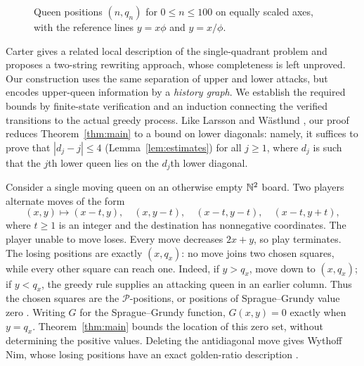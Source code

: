 \begin{figure}[!ht]
\begin{minipage}[c]{0.60\linewidth}
\end{minipage}
\caption{Queen positions $(n,q_n)$ for $0\le n\le100$ on equally scaled
axes, with the reference lines $y=x\phi$ and $y=x/\phi$.}
\label{fig:golden-lines}
\end{figure}

Carter \cite[Section~5]{Carter} gives a related local description of the
single-quadrant problem and proposes a two-string rewriting approach,
whose completeness is left unproved. Our construction uses the same
separation of upper and lower attacks, but encodes upper-queen information
by a \emph{history graph}. We establish the required bounds by
finite-state verification and an induction connecting the verified
transitions to the actual greedy process.
Like Larsson and W\"astlund \cite{LW}, our proof reduces Theorem~\ref{thm:main} to a bound on lower diagonals: namely, it suffices to prove that $|d_j-j|\le4$ (Lemma~\ref{lem:estimates}) for all $j\ge1$, where $d_j$ is such that
the $j$th lower queen lies on the $d_j$th lower diagonal. 

\begin{remark}
Consider a single moving queen on an otherwise empty $\mathbb N^2$ board.
Two players alternate moves of the form
\[
 (x,y)\longmapsto(x-t,y),\quad(x,y-t),\quad
 (x-t,y-t),\quad(x-t,y+t),
\]
where $t\ge1$ is an integer and the destination has nonnegative
coordinates. The player unable to move loses. Every move decreases
$2x+y$, so play terminates. The losing positions are exactly $(x,q_x)$:
no move joins two chosen squares, while every other square can reach
one. Indeed, if $y>q_x$, move down to $(x,q_x)$; if $y<q_x$, the greedy
rule supplies an attacking queen in an earlier column.
Thus the chosen squares are the $\mathcal P$-positions, or positions
of Sprague--Grundy value zero \cite[Sections~7--8]{DSS}.
Writing $G$ for the Sprague--Grundy function, $G(x,y)=0$ exactly when $y=q_x$.
Theorem~\ref{thm:main} bounds the location of this zero set, without
determining the positive values.
Deleting the antidiagonal move gives Wythoff Nim, whose losing positions
have an exact golden-ratio description \cite[Section~1]{LW}.
\end{remark}

